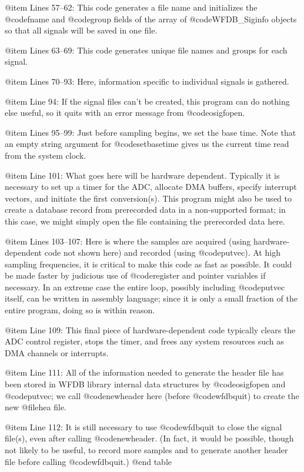 {{{{{{{{{{@item Lines 57--62:
This code generates a file name and initializes the @code{fname} and
@code{group} fields of the array of @code{WFDB_Siginfo} objects so that all
signals will be saved in one file.

@item Lines 63--69:
This code generates unique file names and groups for each signal.

@item Lines 70--93:
Here, information specific to individual signals is gathered.

@item Line 94:
If the signal files can't be created, this program can do nothing else
useful, so it quits with an error message from @code{osigfopen}.

@item Lines 95--99:
Just before sampling begins, we set the base time.  Note that an empty
string argument for @code{setbasetime} gives us the current time read from
the system clock.

@item Line 101:
What goes here will be hardware dependent.  Typically it is necessary to
set up a timer for the ADC, allocate DMA buffers, specify interrupt vectors,
and initiate the first conversion(s).  This program might also be used to
create a database record from prerecorded data in a non-supported format;
in this case, we might simply open the file containing the prerecorded data
here.

@item Lines 103--107:
Here is where the samples are acquired (using hardware-dependent code
not shown here) and recorded (using @code{putvec}).  At high sampling
frequencies, it is critical to make this code as fast as possible.  It
could be made faster by judicious use of @code{register} and pointer
variables if necessary.  In an extreme case the entire loop, possibly
including @code{putvec} itself, can be written in assembly language;
since it is only a small fraction of the entire program, doing so is
within reason.

@item Line 109:
This final piece of hardware-dependent code typically clears the ADC
control register, stops the timer, and frees any system resources such as
DMA channels or interrupts.

@item Line 111:
All of the information needed to generate the header file has been
stored in WFDB library internal data structures by @code{osigfopen} and 
@code{putvec};  we call @code{newheader} here (before @code{wfdbquit}) to
create the new @file{hea} file.

@item Line 112:
It is still necessary to use @code{wfdbquit} to close the signal file(s),
even after calling @code{newheader}.  (In fact, it would be possible,
though not likely to be useful, to record more samples and to generate
another header file before calling @code{wfdbquit}.)
@end table

}}}}}}}}}}
